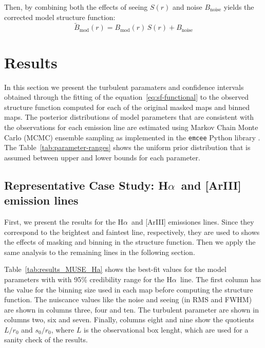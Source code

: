 \documentclass[fleqn,usenatbib, useAMS, a4paper]{mnras}
\newcommand\noise{\ensuremath{_{\text{noise}}}}
\newcommand\model{\ensuremath{_{\mathrm{mod}}}}
\newcommand\halpha{H${\alpha}$}
\begin{document}
Then, by combining both the effects of seeing $S(r)$ and noise $B\noise$ yields the corrected model structure function:
\begin{equation}
  \tilde{B}\model(r) = B\model(r) \,  S(r) + B\noise
  \label{eq:sf-functional}
\end{equation}


\section{Results}\label{sec:results}

In this section we present the turbulent paramaters and confidence intervals obtained through the fitting of the equation~\eqref{eq:sf-functional} to the observed structure function computed for each of the original masked maps and binned maps.
The posterior distributions of model parameters that are consistent with the observations for each emission line are estimated using Markov Chain Monte Carlo (MCMC) ensemble sampling \citep{2010CAMCS...5...65G} as implemented in the \texttt{emcee} Python library \citep{2013PASP..125..306F}.
The Table~\ref{tab:parameter-ranges} shows the uniform prior distribution that is assumed between upper and lower bounds for each parameter.





\subsection{Representative Case Study: \halpha\ and [ArIII] emission lines}\label{sec:discussion}

First, we present the results for the \halpha\ and [ArIII] emissiones lines.
Since they correspond to the brightest and faintest line, respectively, they are used to shows the effects of masking and binning in the structure function.
Then we apply the same analysis to the remaining lines in the following section.

Table~\ref{tab:results_MUSE_Ha} shows the best-fit values for the model parameters with  with 95\% credibility range for the \halpha\ line. 
The first column has the value for the binning size used in each map before computing the structure function.
The nuiscance values like the noise and seeing (in RMS and FWHM) are shown in columns three, four and ten.
The turbulent parameter are shown in columns two, six and seven.
Finally, columns eight and nine show the quotients $L/r_0$ and $s_0/r_0$, where $L$ is the observational box lenght, which are used for a sanity check of the results.
\end{document}
